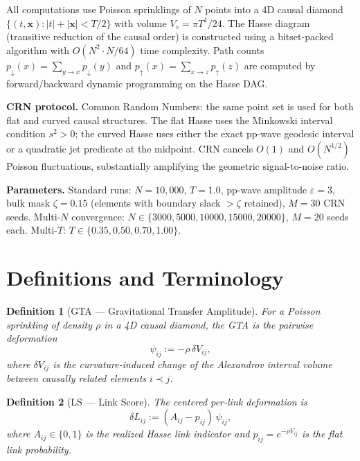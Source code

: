 \documentclass[12pt,a4paper]{article}
\newtheorem{definition}{Definition}
\begin{document}
All computations use Poisson sprinklings of $N$ points into a 4D causal diamond $\{(t,\mathbf{x}): |t| + |\mathbf{x}| < T/2\}$ with volume $V_\diamond = \pi T^4/24$.
The Hasse diagram (transitive reduction of the causal order) is constructed using a bitset-packed algorithm with $O(N^2 \cdot N/64)$ time complexity.
Path counts $p_\downarrow(x) = \sum_{y \to x} p_\downarrow(y)$ and $p_\uparrow(x) = \sum_{x \to z} p_\uparrow(z)$ are computed by forward/backward dynamic programming on the Hasse DAG.

\textbf{CRN protocol.}
Common Random Numbers: the same point set is used for both flat and curved causal structures. The flat Hasse uses the Minkowski interval condition $s^2 > 0$; the curved Hasse uses either the exact pp-wave geodesic interval or a quadratic jet predicate at the midpoint. CRN cancels $O(1)$ and $O(N^{1/2})$ Poisson fluctuations, substantially amplifying the geometric signal-to-noise ratio.

\textbf{Parameters.}
Standard runs: $N = 10{,}000$, $T = 1.0$, pp-wave amplitude $\varepsilon = 3$, bulk mask $\zeta = 0.15$ (elements with boundary slack $> \zeta$ retained), $M = 30$ CRN seeds. Multi-$N$ convergence: $N \in \{3000, 5000, 10000, 15000, 20000\}$, $M = 20$ seeds each. Multi-$T$: $T \in \{0.35, 0.50, 0.70, 1.00\}$.

\section{Definitions and Terminology}

\begin{definition}[GTA --- Gravitational Transfer Amplitude]
For a Poisson sprinkling of density $\rho$ in a 4D causal diamond, the GTA is the pairwise deformation
\begin{equation}
  \psi_{ij} := -\rho\,\delta V_{ij},
\end{equation}
where $\delta V_{ij}$ is the curvature-induced change of the Alexandrov interval volume~\cite{GS2007} between causally related elements $i \prec j$.
\end{definition}

\begin{definition}[LS --- Link Score]
The centered per-link deformation is
\begin{equation}
  \delta L_{ij} := (A_{ij} - p_{ij})\,\psi_{ij},
\end{equation}
where $A_{ij} \in \{0,1\}$ is the realized Hasse link indicator and $p_{ij} = e^{-\rho V_{ij}}$ is the flat link probability.
\end{definition}
\end{document}
